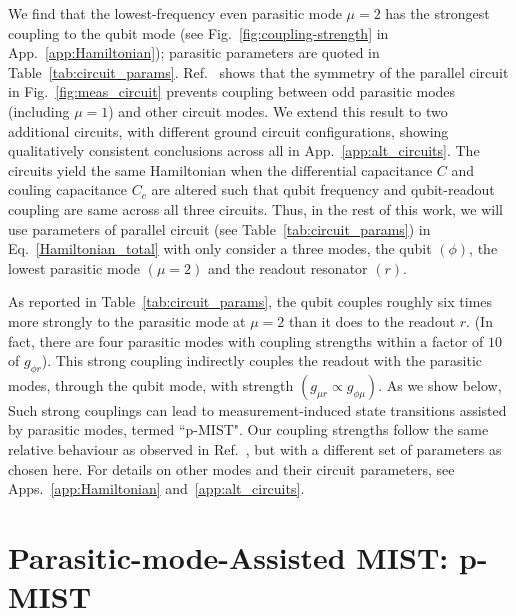 \documentclass[%
reprint,
superscriptaddress,
 amsmath,amssymb,
 aps,
 prx,
longbibliography,
floatfix,
]{revtex4-2}
\begin{document}
 We find that the lowest-frequency even parasitic mode $\mu=2$ has the strongest coupling to the qubit mode (see Fig.~\ref{fig:coupling-strength} in App.~\ref{app:Hamiltonian}); parasitic parameters are quoted in Table~\ref{tab:circuit_params}. Ref.~\cite{viola2015collective} shows that the symmetry of the parallel circuit in Fig.~\ref{fig:meas_circuit} prevents coupling between odd parasitic modes (including $\mu=1$) and other circuit modes. We extend this result to two additional circuits, with different ground circuit configurations, showing qualitatively consistent conclusions across all in App.~\ref{app:alt_circuits}. The circuits yield the same Hamiltonian when the differential capacitance $C$ and couling capacitance $C_c$ are altered such that qubit frequency and qubit-readout coupling are same across all three circuits. Thus, in the rest of this work, we will use parameters of parallel circuit (see Table~\ref{tab:circuit_params}) in Eq.~\ref{Hamiltonian_total} with only consider a three modes, the qubit $(\phi)$, the lowest parasitic mode $(\mu=2)$ and the readout resonator $(r)$. 
 
As reported in Table~\ref{tab:circuit_params}, the qubit couples roughly six times more strongly to the parasitic mode at $\mu=2$ than it does to the readout $r$. (In fact, there are four parasitic modes with coupling strengths within a factor of $10$ of $g_{\phi r}$). This strong coupling indirectly couples the readout with the parasitic modes, through the qubit mode, with strength $(g_{\mu r}\propto g_{\phi\mu})$. As we show below, Such strong couplings can lead to measurement-induced state transitions assisted by parasitic modes, termed ``p-MIST". Our coupling strengths follow the same relative behaviour as observed in Ref.~\cite{viola2015collective}, but with a different set of parameters as chosen here. For details on other modes and their circuit parameters, see Apps.~\ref{app:Hamiltonian} and~\ref{app:alt_circuits}. 

\section{Parasitic-mode-Assisted MIST: p-MIST}\label{sec:MIST}
\end{document}
